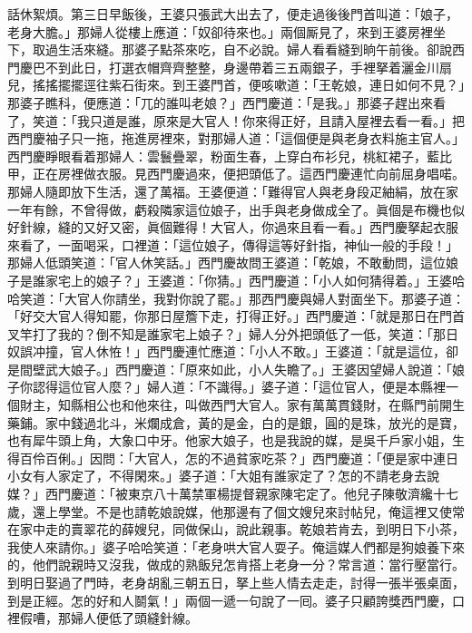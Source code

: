 話休絮煩。第三日早飯後，王婆只張武大出去了，便走過後後門首叫道：「娘子，老身大膽。」那婦人從樓上應道：「奴卻待來也。」兩個厮見了，來到王婆房裡坐下，取過生活來縫。那婆子點茶來吃，自不必說。婦人看看縫到晌午前後。卻說西門慶巴不到此日，{}打選衣帽齊齊整整，身邊帶着三五兩銀子，手裡拏着灑金川扇兒，搖搖擺擺逕往紫石街來。到王婆門首，便咳嗽道：「王乾娘，連日如何不見？」那婆子瞧科，便應道：「兀的誰叫老娘？」西門慶道：「是我。」那婆子趕出來看了，笑道：「我只道是誰，原來是大官人！你來得正好，且請入屋裡去看一看。」把西門慶袖子只一拖，拖進房裡來，對那婦人道：「這個便是與老身衣料施主官人。」西門慶睜眼看着那婦人：雲鬟疊翠，粉面生春，上穿白布衫兒，桃紅裙子，藍比甲，正在房裡做衣服。見西門慶過來，便把頭低了。{}這西門慶連忙向前屈身唱喏。那婦人隨即放下生活，還了萬福。王婆便道：「難得官人與老身段疋紬絹，放在家一年有餘，不曾得做，虧殺隣家這位娘子，出手與老身做成全了。眞個是布機也似好針線，縫的又好又密，眞個難得！大官人，你過來且看一看。」西門慶拏起衣服來看了，一面喝采，口裡道：「這位娘子，傳得這等好針指，神仙一般的手段！」那婦人低頭笑道：「官人休笑話。」{}西門慶故問王婆道：「乾娘，不敢動問，這位娘子是誰家宅上的娘子？」王婆道：「你猜。」西門慶道：「小人如何猜得着。」王婆哈哈笑道：「大官人你請坐，我對你說了罷。」那西門慶與婦人對面坐下。那婆子道：「好交大官人得知罷，你那日屋簷下走，打得正好。」西門慶道：「就是那日在門首叉竿打了我的？倒不知是誰家宅上娘子？」婦人分外把頭低了一低，笑道：「那日奴誤冲撞，官人休恠！」{}西門慶連忙應道：「小人不敢。」王婆道：「就是這位，卻是間壁武大娘子。」西門慶道：「原來如此，小人失瞻了。」王婆因望婦人說道：「娘子你認得這位官人麼？」婦人道：「不識得。」婆子道：「這位官人，便是本縣裡一個財主，知縣相公也和他來往，叫做西門大官人。家有萬萬貫錢財，在縣門前開生藥鋪。家中錢過北斗，米爛成倉，黃的是金，白的是銀，圓的是珠，放光的是寶，也有犀牛頭上角，大象口中牙。他家大娘子，也是我說的媒，是吳千戶家小姐，生得百伶百俐。」因問：「大官人，怎的不過貧家吃茶？」西門慶道：「便是家中連日小女有人家定了，不得閑來。」婆子道：「大姐有誰家定了？怎的不請老身去說媒？」西門慶道：「被東京八十萬禁軍楊提督親家陳宅定了。他兒子陳敬濟纔十七歲，還上學堂。不是也請乾娘說媒，他那邊有了個文嫂兒來討帖兒，俺這裡又使常在家中走的賣翠花的薛嫂兒，同做保山，說此親事。乾娘若肯去，到明日下小茶，我使人來請你。」婆子哈哈笑道：「老身哄大官人耍子。俺這媒人們都是狗娘養下來的，他們說親時又沒我，做成的熟飯兒怎肯搭上老身一分？常言道：當行壓當行。到明日娶過了門時，老身胡亂三朝五日，拏上些人情去走走，討得一張半張桌面，到是正經。怎的好和人鬬氣！」兩個一遞一句說了一囘。婆子只顧誇獎西門慶，口裡假嘈，那婦人便低了頭縫針線。

